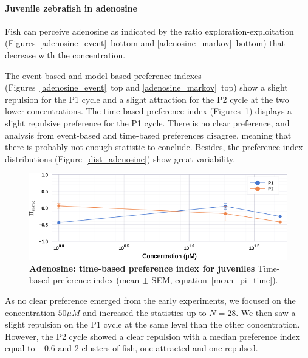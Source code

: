   \paragraph{Juvenile zebrafish in adenosine} Fish can perceive adenosine as indicated by the ratio exploration-exploitation (Figures~\ref{adenosine_event}~bottom and \ref{adenosine_markov}~bottom) that decrease with the concentration.

  The event-based and model-based preference indexes (Figures~\ref{adenosine_event}~top and \ref{adenosine_markov}~top) show a slight repulsion for the P1 cycle and a slight attraction for the P2 cycle at the two lower concentrations.  The time-based preference index (Figures~\ref{adenosine}) displays a slight repulsive preference for the P1 cycle. There is no clear preference, and analysis from event-based and time-based preferences disagree, meaning that there is probably not enough statistic to conclude. Besides, the preference index distributions (Figure~\ref{dist_adenosine}) show great variability.

    \begin{figure}[h!]
      \centering
      \includegraphics[width=1\textwidth]{part_2/assets/adenosine.png}
      \caption{\textbf{Adenosine: time-based preference index for juveniles} Time-based preference index (mean $\pm$ SEM, equation~\ref{mean_pi_time}).}
      \label{adenosine}
    \end{figure}

  As no clear preference emerged from the early experiments, we focused on the concentration $50 \mu M$ and increased the statistics up to $N=28$. We then saw a slight repulsion on the P1 cycle at the same level than the other concentration. However, the P2 cycle showed a clear repulsion with a median preference index equal to $-0.6$ and 2 clusters of fish, one attracted and one repulsed.

